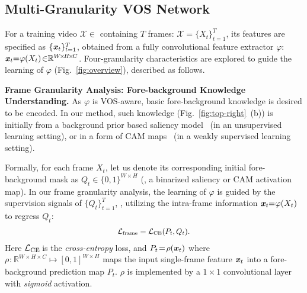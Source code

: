 \documentclass[10pt,twocolumn,letterpaper]{article}
\begin{document}
\subsection{Multi-Granularity VOS Network}
\vspace{-1pt}
\label{sec:multi-gran-network}
For a training video $\mathcal{X}\!\!\in$ containing $T$ frames: $\mathcal{X}\!=\!\{X_t\}_{t=1}^T$, its features are specified as $\{\textbf{\textit{x}}_{t}\}_{t=1}^T$, obtained from a fully convolutional feature extractor $\varphi$: $\textbf{\textit{x}}_{t\!}\!=_{\!}\!\varphi(X_t)\!\in_{\!}\!\mathbb{R}^{W\!\times\! H\!\times\!C}$. Four-granularity
characteristics are explored to guide the learning of $\varphi$ (Fig.~\!\ref{fig:overview}), described as follows.

\noindent\textbf{Frame Granularity Analysis: Fore-background Knowledge Understanding.} As $\varphi$ is VOS-aware, basic fore-background knowledge is desired to be encoded. In our method, such knowledge (Fig.~\!\ref{fig:top-right}~\!(b)) is initially from a background prior based saliency model~\!\cite{DBLP:conf/cvpr/YangZLRY13} (in an unsupervised learning setting), or in a form of CAM maps~\!\cite{zeng2019multi,zhou2016learning} (in a weakly supervised learning setting).

Formally, for each frame $X_t$, let us denote its corresponding initial fore-background mask as $Q_t\!\in\!\{0,1\}^{W\!\times\!H}$ (\ie, a binarized saliency or CAM activation map). In our frame granularity analysis, the learning of $\varphi$ is guided by the supervision signals of $\{Q_t\}_{t=1}^T$, \ie, utilizing the intra-frame information $\textbf{\textit{x}}_{t\!}\!=_{\!}\!\varphi(X_t)$ to regress $Q_t$:
\vspace{-2pt}
\begin{equation}\small
\begin{aligned}
\mathcal{L}_{\text{frame}}=\mathcal{L}_{\text{CE}}(P_t, Q_t).
\end{aligned}
\vspace{-2pt}
\label{eq:frame}
\end{equation}
Here $\mathcal{L}_{\text{CE\!}}$ is the \textit{cross-entropy} loss, and $P_t\!=\!\rho(\textbf{\textit{x}}_{t})$ where $\rho_{\!}\!:_{\!}\!\mathbb{R}^{\!W\!\times\!H\!\times\!C}\!\!\mapsto\!\![0,1]^{\!W\!\times\!H\!}$ maps the input single-frame feature $\textbf{\textit{x}}_{t}$ into a fore-background prediction map $P_t$. $\rho$ is implemented by a $1\!\times\!1$ convolutional layer with \textit{sigmoid} activation.
\end{document}
